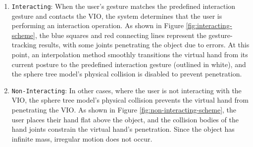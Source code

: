 \begin{enumerate}
  \item {\texttt{Interacting}}: When the user's gesture matches the predefined interaction gesture and contacts the VIO, the system determines that the user is performing an interaction operation. As shown in Figure \ref{fig:interacting-scheme}, the blue squares and red connecting lines represent the gesture-tracking results, with some joints penetrating the object due to errors. At this point, an interpolation method smoothly transitions the virtual hand from its current posture to the predefined interaction gesture (outlined in white), and the sphere tree model's physical collision is disabled to prevent penetration.

  \item {\texttt{Non-Interacting}}: In other cases, where the user is not interacting with the VIO, the sphere tree model's physical collision prevents the virtual hand from penetrating the VIO. As shown in Figure \ref{fig:non-interacting-scheme}, the user places their hand flat above the object, and the collision bodies of the hand joints constrain the virtual hand's penetration. Since the object has infinite mass, irregular motion does not occur.
\end{enumerate}


